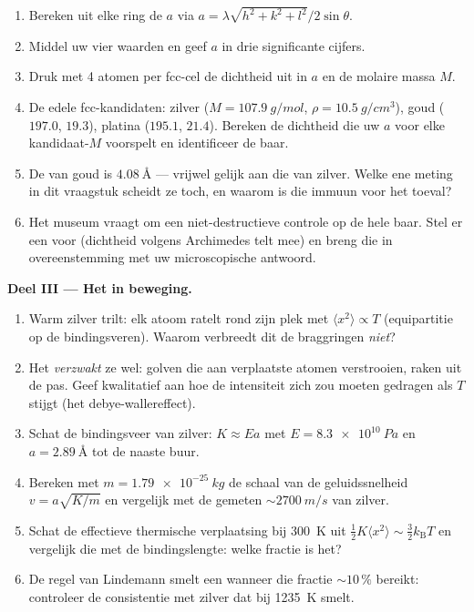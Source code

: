 \begin{problem}
\begin{enumerate}[resume]
  \item Bereken uit elke ring de  $a$ via
        $a = \lambda\sqrt{h^2+k^2+l^2}/2\sin\theta$.
  \item Middel uw vier waarden en geef $a$ in drie
        significante cijfers.
  \item Druk met 4 atomen per fcc-cel de dichtheid uit in
        $a$ en de molaire massa $M$.
  \item De edele fcc-kandidaten: zilver
        ($M = \qty{107.9}{g/mol}$, $\rho = \qty{10.5}{g/cm^3}$),
        goud ($197.0$, $19.3$), platina ($195.1$, $21.4$).
        Bereken de dichtheid die uw $a$ voor elke kandidaat-$M$
        voorspelt en identificeer de baar.
  \item De  van goud is $\qty{4.08}{\angstrom}$ ---
        vrijwel gelijk aan die van zilver. Welke ene meting in
        dit vraagstuk scheidt ze toch, en waarom is die immuun
        voor het toeval?
  \item Het museum vraagt om een niet-destructieve controle op de hele
        baar. Stel er een voor (dichtheid volgens Archimedes telt mee) en
        breng die in overeenstemming met uw microscopische antwoord.
\end{enumerate}

\medskip\noindent\textbf{Deel III --- Het  in beweging.}

\begin{enumerate}[resume]
  \item Warm zilver trilt: elk atoom ratelt rond zijn plek
        met $\langle x^2\rangle \propto T$ (equipartitie op de
        bindingsveren). Waarom verbreedt dit de braggringen \emph{niet}?
  \item Het \emph{verzwakt} ze wel: golven die aan verplaatste
        atomen verstrooien, raken uit de pas. Geef kwalitatief aan hoe de
        intensiteit zich zou moeten gedragen als $T$ stijgt (het
        debye-wallereffect).
  \item Schat de bindingsveer van zilver: $K \approx Ea$ met
        $E = \qty{8.3e10}{Pa}$ en $a = \qty{2.89}{\angstrom}$ tot
        de naaste buur.
  \item Bereken met $m = \qty{1.79e-25}{kg}$ de schaal van de
        geluidssnelheid $v = a\sqrt{K/m}$ en vergelijk met de gemeten
        $\sim\qty{2700}{m/s}$ van zilver.
  \item Schat de effectieve thermische verplaatsing bij \qty{300}{K}
        uit $\tfrac12K\langle x^2\rangle \sim
        \tfrac32k_{\text{B}}T$ en vergelijk die met de
        bindingslengte: welke fractie is het?
  \item De regel van Lindemann smelt een  wanneer die fractie
        $\sim10\,\%$ bereikt: controleer de consistentie met zilver
        dat bij \qty{1235}{K} smelt.
\end{enumerate}


\end{problem}
